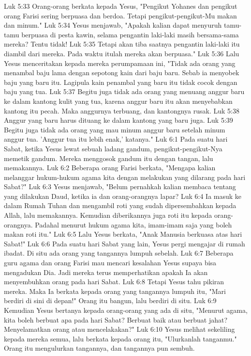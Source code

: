 Luk 5:33  Orang-orang berkata kepada Yesus, "Pengikut Yohanes dan pengikut orang Farisi sering berpuasa dan berdoa. Tetapi pengikut-pengikut-Mu makan dan minum."
Luk 5:34  Yesus menjawab, "Apakah kalian dapat menyuruh tamu-tamu berpuasa di pesta kawin, selama pengantin laki-laki masih bersama-sama mereka? Tentu tidak!
Luk 5:35  Tetapi akan tiba saatnya pengantin laki-laki itu diambil dari mereka. Pada waktu itulah mereka akan berpuasa."
Luk 5:36  Lalu Yesus menceritakan kepada mereka perumpamaan ini, "Tidak ada orang yang menambal baju lama dengan sepotong kain dari baju baru. Sebab ia menyobek baju yang baru itu. Lagipula kain penambal yang baru itu tidak cocok dengan baju yang tua.
Luk 5:37  Begitu juga tidak ada orang yang menuang anggur baru ke dalam kantong kulit yang tua, karena anggur baru itu akan menyebabkan kantong itu pecah. Maka anggurnya terbuang, dan kantongnya rusak.
Luk 5:38  Anggur yang baru harus dituang ke dalam kantong yang baru juga.
Luk 5:39  Begitu juga tidak ada orang yang mau minum anggur baru setelah minum anggur tua. 'Anggur tua itu lebih enak,' katanya."
Luk 6:1  Pada suatu hari Sabat, ketika Yesus lewat sebuah ladang gandum, pengikut-pengikut-Nya memetik gandum. Mereka menggosok gandum itu dengan tangan, lalu memakannya.
Luk 6:2  Beberapa orang Farisi berkata, "Mengapa kalian melanggar hukum-hukum agama kita dengan melakukan yang dilarang pada hari Sabat?"
Luk 6:3  Yesus menjawab, "Belum pernahkah kalian membaca tentang yang dilakukan Daud, ketika ia dan orang-orangnya lapar?
Luk 6:4  Ia masuk ke dalam Rumah Tuhan dan mengambil roti yang sudah dipersembahkan kepada Allah, lalu memakannya. Kemudian diberikannya juga roti itu kepada orang-orangnya. Padahal menurut hukum agama kita, imam-imam saja yang boleh makan roti itu."
Luk 6:5  Lalu Yesus berkata, "Anak Manusia berkuasa atas hari Sabat!"
Luk 6:6  Pada suatu hari Sabat yang lain, Yesus pergi mengajar di rumah ibadat. Di situ ada orang yang tangannya lumpuh sebelah.
Luk 6:7  Beberapa guru agama dan orang Farisi mau mencari kesalahan Yesus supaya bisa mengadukan Dia. Jadi mereka terus memperhatikan apakah Ia akan menyembuhkan orang pada hari Sabat.
Luk 6:8  Tetapi Yesus tahu pikiran mereka. Maka Ia berkata kepada orang yang tangannya lumpuh itu, "Mari berdiri di sini di depan!" Orang itu bangun, lalu berdiri di situ.
Luk 6:9  Kemudian Yesus bertanya kepada orang-orang yang ada di situ, "Menurut agama, kita boleh berbuat apa pada hari Sabat? Berbuat baik atau berbuat jahat? Menyelamatkan orang atau mencelakakan?"
Luk 6:10  Yesus melihat sekeliling kepada mereka semua, lalu berkata kepada orang itu, "Ulurkanlah tanganmu." Orang itu mengulurkan tangannya, dan tangannya pun sembuh.
